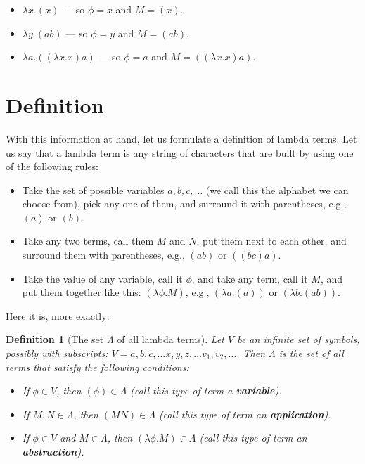 \documentclass{book}
\numberwithin{equation}{chapter}
\newcommand{\vocab}{\textbf}
\newtheorem{definition}{Definition}
\begin{document}
\begin{itemize}
\item{$\lambda x.(x)$ --- so $\phi = x$ and $M = (x)$.}
\item{$\lambda y.(ab)$ --- so $\phi = y$ and $M = (ab)$.}
\item{$\lambda a.((\lambda x.x)a)$ --- so $\phi = a$ and $M = ((\lambda x.x)a)$.}
\end{itemize}


\section{Definition}

With this information at hand, let us formulate a definition of lambda terms. Let us say that a lambda term is any string of characters that are built by using one of the following rules:  

\begin{itemize}
\item{Take the set of possible variables $a, b, c, \ldots$ (we call this the alphabet we can choose from), pick any one of them, and surround it with parentheses, e.g., $(a)$ or $(b)$.}
\item{Take any two terms, call them $M$ and $N$, put them next to each other, and surround them with parentheses, e.g., $(ab)$ or $((bc)a)$.}
\item{Take the value of any variable, call it $\phi$, and take any term, call it $M$, and put them together like this: $(\lambda \phi.M)$, e.g., $(\lambda a.(a))$ or $(\lambda b.(a b))$.}
\end{itemize}

\noindent
Here it is, more exactly:

\begin{definition}[The set $\Lambda$ of all lambda terms]
Let $V$ be an infinite set of symbols, possibly with subscripts: $V = {a, b, c, \ldots x, y, z, \ldots v_{1}, v_{2}, \ldots}$. Then $\Lambda$ is the set of all terms that satisfy the following conditions:

\begin{itemize}
\item{If $\phi \in V$, then $(\phi) \in \Lambda$ (call this type of term a \vocab{variable}).}
\item{If $M, N \in \Lambda$, then $(MN) \in \Lambda$ (call this type of term an \vocab{application}).}
\item{If $\phi \in V$ and $M \in \Lambda$, then $(\lambda \phi.M) \in \Lambda$ (call this type of term an \vocab{abstraction}).}
\end{itemize}
\end{definition}
\end{document}

